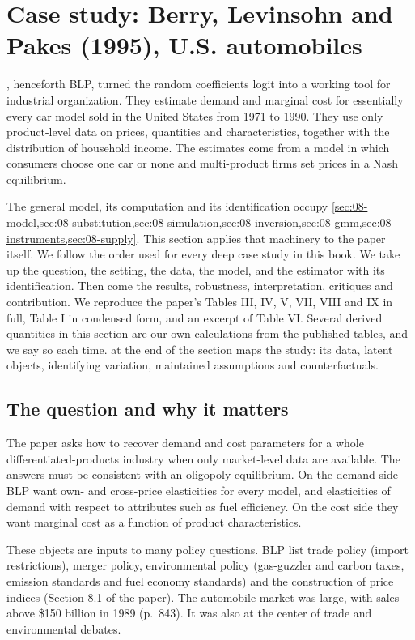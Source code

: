 \section{Case study: Berry, Levinsohn and Pakes (1995), U.S. automobiles}\label{sec:08-blp95}

\citet{BerryLevinsohnPakes1995}, henceforth BLP, turned the random coefficients logit into a working
tool for industrial organization. They estimate demand and marginal cost for essentially every car
model sold in the United States from 1971 to 1990. They use only product-level data on prices,
quantities and characteristics, together with the distribution of household income. The estimates
come from a model in which consumers choose one car or none and multi-product firms set prices in a
Nash equilibrium.

The general model, its computation and its identification occupy
\cref{sec:08-model,sec:08-substitution,sec:08-simulation,sec:08-inversion,sec:08-gmm,sec:08-instruments,sec:08-supply}.
This section applies that machinery to the paper itself. We follow the order used for every deep case
study in this book. We take up the question, the setting, the data, the model, and the estimator with
its identification. Then come the results, robustness, interpretation, critiques and contribution. We
reproduce the
paper's Tables III, IV, V, VII, VIII and IX in full, Table I in condensed form, and an excerpt of
Table VI. Several derived quantities in this section are our own calculations from the published
tables, and we say so each time.  at the end of the section maps the study: its
data, latent objects, identifying variation, maintained assumptions and counterfactuals.

\subsection{The question and why it matters}\label{sec:08-blp95-question}

The paper asks how to recover demand and cost parameters for a whole differentiated-products industry
when only market-level data are available. The answers must be consistent with an oligopoly
equilibrium. On the demand side BLP want own- and cross-price elasticities for every model, and
elasticities of demand with respect to attributes such as fuel efficiency. On the cost side they want
marginal cost as a function of product characteristics.

These objects are inputs to many policy questions. BLP list trade policy (import restrictions),
merger policy, environmental policy (gas-guzzler and carbon taxes, emission standards and fuel
economy standards) and the construction of price indices (Section 8.1 of the paper). The automobile
market was large, with sales above \$150 billion in 1989 (p.~843). It was also at the center of trade
and environmental debates.


